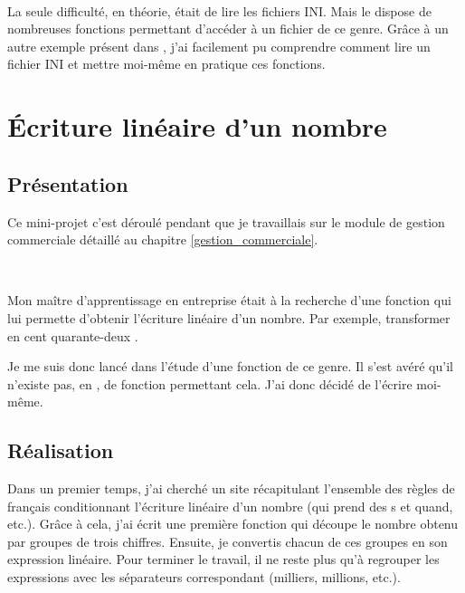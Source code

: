 ~

La seule difficulté, en théorie, était de lire les fichiers INI. Mais le \vb{} dispose de nombreuses fonctions permettant d'accéder à un fichier de ce genre. Grâce à un autre exemple présent dans \integrale, j'ai facilement pu comprendre comment lire un fichier INI et mettre moi-même en pratique ces fonctions.

\section{Écriture linéaire d'un nombre}
\subsection{Présentation}
Ce mini-projet c'est déroulé pendant que je travaillais sur le module de gestion commerciale détaillé au chapitre \ref{gestion_commerciale}.

~

Mon maître d'apprentissage en entreprise était à la recherche d'une fonction qui lui permette d'obtenir l'écriture linéaire d'un nombre. Par exemple, transformer  \fg{} en \og cent quarante-deux \fg.

Je me suis donc lancé dans l'étude d'une fonction de ce genre. Il s'est avéré qu'il n'existe pas, en \vb, de fonction permettant cela. J'ai donc décidé  de l'écrire moi-même.

\subsection{Réalisation}
Dans un premier temps, j'ai cherché un site récapitulant l'ensemble des règles de français conditionnant l'écriture linéaire d'un nombre (qui prend des \og s \fg{} et quand, etc.). Grâce à cela, j'ai écrit une première fonction qui découpe le nombre obtenu par groupes de trois chiffres. Ensuite, je convertis chacun de ces groupes en son expression linéaire. Pour terminer le travail, il ne reste plus qu'à regrouper les expressions avec les séparateurs correspondant (milliers, millions, etc.).
